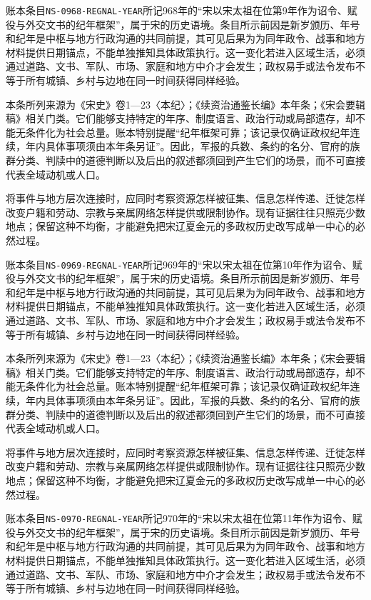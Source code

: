 账本条目\texttt{NS-0968-REGNAL-YEAR}所记968年的“宋以宋太祖在位第9年作为诏令、赋役与外交文书的纪年框架”，属于宋的历史语境。条目所示前因是新岁颁历、年号和纪年是中枢与地方行政沟通的共同前提，其可见后果为为同年政令、战事和地方材料提供日期锚点，不能单独推知具体政策执行。这一变化若进入区域生活，必须通过道路、文书、军队、市场、家庭和地方中介才会发生；政权易手或法令发布不等于所有城镇、乡村与边地在同一时间获得同样经验。

本条所列来源为《宋史》卷1—23〈本纪〉；《续资治通鉴长编》本年条；《宋会要辑稿》相关门类。它们能够支持特定的年序、制度语言、政治行动或局部遗存，却不能无条件化为社会总量。账本特别提醒“纪年框架可靠；该记录仅确证政权纪年连续，年内具体事项须由本年条另证”。因此，军报的兵数、条约的名分、官府的族群分类、判牍中的道德判断以及后出的叙述都须回到产生它们的场景，而不可直接代表全域动机或人口。

将事件与地方层次连接时，应同时考察资源怎样被征集、信息怎样传递、迁徙怎样改变户籍和劳动、宗教与亲属网络怎样提供或限制协作。现有证据往往只照亮少数地点；保留这种不均衡，才能避免把宋辽夏金元的多政权历史改写成单一中心的必然过程。

账本条目\texttt{NS-0969-REGNAL-YEAR}所记969年的“宋以宋太祖在位第10年作为诏令、赋役与外交文书的纪年框架”，属于宋的历史语境。条目所示前因是新岁颁历、年号和纪年是中枢与地方行政沟通的共同前提，其可见后果为为同年政令、战事和地方材料提供日期锚点，不能单独推知具体政策执行。这一变化若进入区域生活，必须通过道路、文书、军队、市场、家庭和地方中介才会发生；政权易手或法令发布不等于所有城镇、乡村与边地在同一时间获得同样经验。

本条所列来源为《宋史》卷1—23〈本纪〉；《续资治通鉴长编》本年条；《宋会要辑稿》相关门类。它们能够支持特定的年序、制度语言、政治行动或局部遗存，却不能无条件化为社会总量。账本特别提醒“纪年框架可靠；该记录仅确证政权纪年连续，年内具体事项须由本年条另证”。因此，军报的兵数、条约的名分、官府的族群分类、判牍中的道德判断以及后出的叙述都须回到产生它们的场景，而不可直接代表全域动机或人口。

将事件与地方层次连接时，应同时考察资源怎样被征集、信息怎样传递、迁徙怎样改变户籍和劳动、宗教与亲属网络怎样提供或限制协作。现有证据往往只照亮少数地点；保留这种不均衡，才能避免把宋辽夏金元的多政权历史改写成单一中心的必然过程。

账本条目\texttt{NS-0970-REGNAL-YEAR}所记970年的“宋以宋太祖在位第11年作为诏令、赋役与外交文书的纪年框架”，属于宋的历史语境。条目所示前因是新岁颁历、年号和纪年是中枢与地方行政沟通的共同前提，其可见后果为为同年政令、战事和地方材料提供日期锚点，不能单独推知具体政策执行。这一变化若进入区域生活，必须通过道路、文书、军队、市场、家庭和地方中介才会发生；政权易手或法令发布不等于所有城镇、乡村与边地在同一时间获得同样经验。

